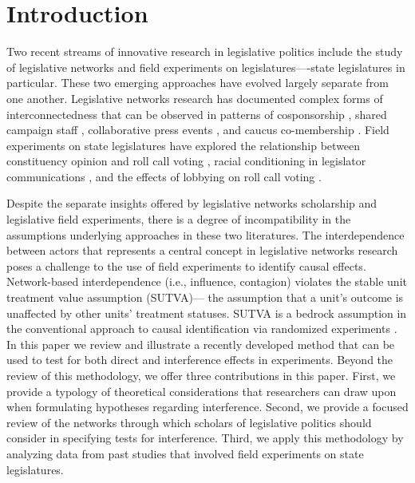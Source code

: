 \documentclass[12pt]{article}
\begin{document}
\thispagestyle{empty}
\doublespacing



\section{Introduction}

Two recent streams of innovative research in legislative politics include the study of legislative networks and field experiments on legislatures----state legislatures in particular. These two emerging approaches have evolved largely separate from one another.  Legislative networks research has documented complex forms of interconnectedness that can be observed in patterns of cosponsorship \citep{kirkland2013hypothesis,kirkland2011relational,fowler2006connecting}, shared campaign staff \citep{nyhan2015connecting}, collaborative press events \citep{desmarais2015measuring}, and caucus co-membership \citep{victor2009social}. Field experiments on state legislatures have explored the relationship between constituency opinion and roll call voting \citep{butler2011can}, racial conditioning in legislator communications \citep{broockman2013black}, and the effects of lobbying on roll call voting \citep{bergan2015call}. 

Despite the separate insights offered by legislative networks scholarship and legislative field experiments, there is a degree of incompatibility in the assumptions underlying approaches in these two literatures. The interdependence between actors that represents a central concept in legislative networks research poses a challenge to the use of field experiments to identify causal effects. Network-based interdependence (i.e., influence, contagion) violates the stable unit treatment value assumption (SUTVA)--- the assumption that a unit's outcome is unaffected by other units' treatment statuses. SUTVA is a bedrock assumption in the conventional approach to causal identification via randomized experiments \citep{sekhon2008}.  In this paper we review and illustrate a recently developed method that can be used to test for both direct and interference effects in experiments. Beyond the review of this methodology, we offer three contributions in this paper. First, we provide a typology of theoretical considerations that researchers can draw upon when formulating hypotheses regarding interference. Second, we provide a focused review of the networks through which scholars of legislative politics should consider in specifying tests for interference. Third, we apply this methodology by analyzing data from past studies that involved field experiments on state legislatures. 
\end{document}
